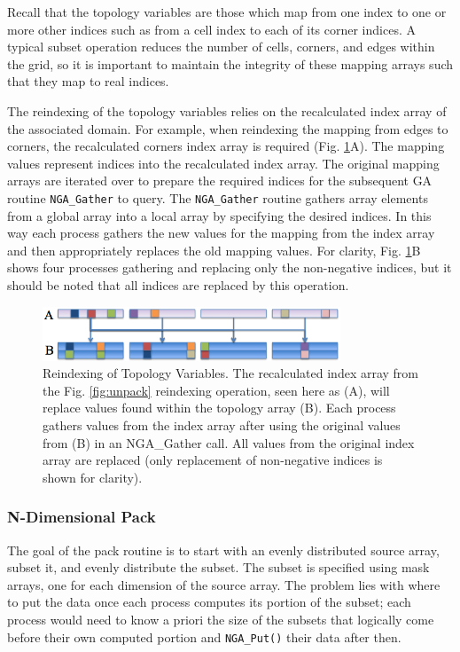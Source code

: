 Recall that the topology variables are those which map from one index to one
or more other indices such as from a cell index to each of its corner indices.
A typical subset operation reduces the number of cells, corners, and edges
within the grid, so it is important to maintain the integrity of these mapping
arrays such that they map to real indices.

The reindexing of the topology variables relies on the recalculated index
array of the associated domain.  For example, when reindexing the mapping from
edges to corners, the recalculated corners index array is required (Fig.
\ref{fig:reindex}A).  The mapping values represent indices into the
recalculated index array.  The original mapping arrays are iterated over to
prepare the required indices for the subsequent GA routine \verb=NGA_Gather=
to query.  The \verb=NGA_Gather= routine gathers array elements from a global
array into a local array by specifying the desired indices.  In this way each
process gathers the new values for the mapping from the index array and then
appropriately replaces the old mapping values.  For clarity, Fig.
\ref{fig:reindex}B shows four processes gathering and replacing only the
non-negative indices, but it should be noted that all indices are replaced by
this operation.

\begin{figure}[!t]
\center
\includegraphics[width=3.5in]{images/reindex2}
\caption{Reindexing of Topology Variables.  The recalculated index array from
the Fig. \ref{fig:unpack} reindexing operation, seen here as (A), will replace
values found within the topology array (B).  Each process gathers values from
the index array after using the original values from (B) in an NGA\_Gather
call.  All values from the original index array are replaced (only replacement
of non-negative indices is shown for clarity).}
\label{fig:reindex}
\end{figure}

\subsubsection{N-Dimensional Pack}
\label{section:alg_pack}

The goal of the pack routine is to start with an evenly distributed source
array, subset it, and evenly distribute the subset.  The subset is specified
using mask arrays, one for each dimension of the source array.  The problem
lies with where to put the data once each process computes its portion of the
subset; each process would need to know a priori the size of the subsets that
logically come before their own computed portion and \verb=NGA_Put()= their
data after then.

